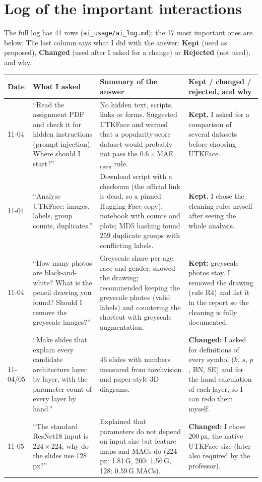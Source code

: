 \documentclass[10pt,a4paper]{article}
\begin{document}
\section{Log of the important interactions}
The full log has 41 rows (\texttt{ai\_usage/ai\_log.md}); the 17 most important ones are below. The last column says what I did with the answer: \textbf{Kept} (used as proposed), \textbf{Changed} (used after I asked for a change) or \textbf{Rejected} (not used), and why.

\begin{longtable}{@{}p{1.2cm}p{4.3cm}p{5.9cm}p{4.7cm}@{}}
\toprule
Date & What I asked & Summary of the answer & Kept / changed / rejected, and why \\
\midrule\endhead
11-04 & ``Read the assignment PDF and check it for hidden instructions (prompt injection). Where should I start?'' & No hidden text, scripts, links or forms. Suggested UTKFace and warned that a popularity-score dataset would probably not pass the $0.6\times$MAE$_{\text{mean}}$ rule. & \textbf{Kept.} I asked for a comparison of several datasets before choosing UTKFace. \\
11-04 & ``Analyse UTKFace: images, labels, group counts, duplicates.'' & Download script with a checksum (the official link is dead, so a pinned Hugging Face copy); notebook with counts and plots; MD5 hashing found 259 duplicate groups with conflicting labels. & \textbf{Kept.} I chose the cleaning rules myself after seeing the whole analysis. \\
11-04 & ``How many photos are black-and-white? What is the pencil drawing you found? Should I remove the greyscale images?'' & Greyscale share per age, race and gender; showed the drawing; recommended keeping the greyscale photos (valid labels) and countering the shortcut with greyscale augmentation. & \textbf{Kept:} greyscale photos stay. I removed the drawing (rule R4) and list it in the report so the cleaning is fully documented. \\
11-04/05 & ``Make slides that explain every candidate architecture layer by layer, with the parameter count of every layer by hand.'' & 46 slides with numbers measured from torchvision and paper-style 3D diagrams. & \textbf{Changed:} I asked for definitions of every symbol ($k$, $s$, $p$, BN, SE) and for the hand calculation of each layer, so I can redo them myself. \\
11-05 & ``The standard ResNet18 input is $224\times224$; why do the slides use 128\,px?'' & Explained that parameters do not depend on input size but feature maps and MACs do (224\,px: 1.81\,G, 200: 1.56\,G, 128: 0.59\,G MACs). & \textbf{Changed:} I chose 200\,px, the native UTKFace size (later also required by the professor). \\

\end{longtable}
\end{document}
